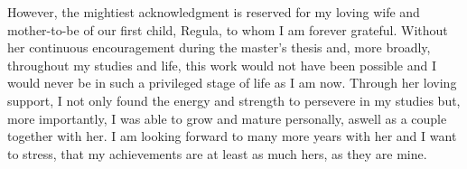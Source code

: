 \documentclass[a4paper,11pt]{report}
\def\blank#1{{\color{white}{#1}}}
\begin{document}
However, the mightiest acknowledgment is reserved for my loving wife and mother-to-be of our first child, Regula, to whom I am forever grateful. Without her continuous encouragement during the master's thesis and, more broadly, throughout my studies and life, this work would not have been possible and I would never be in such a privileged stage of life as I am now. Through her loving support, I not only found the energy and strength to persevere in my studies but, more importantly, I was able to grow and mature personally, aswell as a couple together with her. I am looking forward to many more years with her and I want to stress, that my achievements are at least as much hers, as they are mine.

\nocite{ChatGPT}



\newpage

\thispagestyle{empty}
\end{document}
